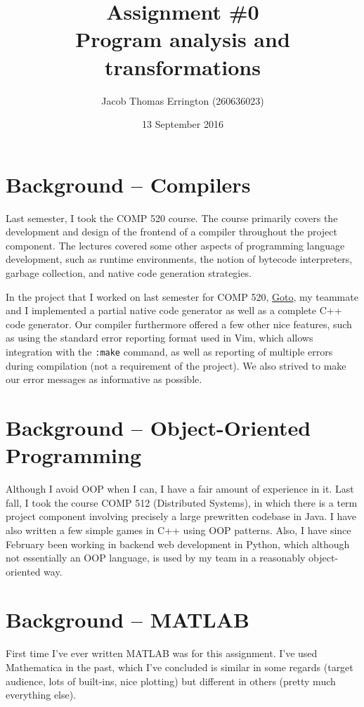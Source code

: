 \documentclass[letterpaper,11pt]{article}
\author{Jacob Thomas Errington (260636023)}
\title{Assignment \#0\\Program analysis and transformations}
\date{13 September 2016}
\begin{document}
\maketitle

\section{Background -- Compilers}

Last semester, I took the \textsc{COMP 520} course. The course primarily covers
the development and design of the frontend of a compiler throughout the project
component. The lectures covered some other aspects of programming language
development, such as runtime environments, the notion of bytecode interpreters,
garbage collection, and native code generation strategies.

In the project that I worked on last semester for \textsc{COMP 520},
\href{https://github.com/tsani/goto}{Goto}, my teammate and I implemented a
partial native code generator as well as a complete C++ code generator. Our
compiler furthermore offered a few other nice features, such as using the
standard error reporting format used in Vim, which allows integration with the
\texttt{:make} command, as well as reporting of multiple errors during
compilation (not a requirement of the project). We also strived to make our
error messages as informative as possible.

\section{Background -- Object-Oriented Programming}

Although I avoid OOP when I can, I have a fair amount of experience in it. Last
fall, I took the course \textsc{COMP 512} (Distributed Systems), in which there
is a term project component involving precisely a large prewritten codebase in
Java. I have also written a few simple games in C++ using OOP patterns. Also,
I have since February been working in backend web development in Python, which
although not essentially an OOP language, is used by my team in a reasonably
object-oriented way.

\section{Background -- \textsc{MATLAB}}

First time I've ever written MATLAB was for this assignment. I've used
Mathematica in the past, which I've concluded is similar in some regards
(target audience, lots of built-ins, nice plotting) but different in others
(pretty much everything else).
\end{document}
